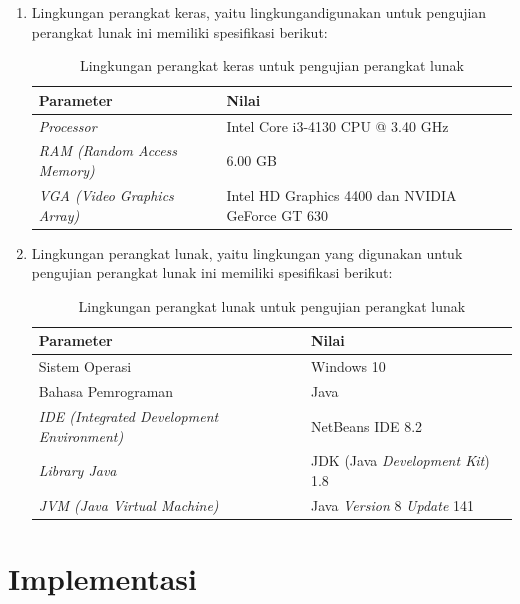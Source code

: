 \begin{enumerate}
\item Lingkungan perangkat keras, yaitu lingkungandigunakan untuk pengujian perangkat lunak ini memiliki spesifikasi berikut:

\begin{table}
\centering
\captionsetup{justification=centering}
\caption[Lingkungan perangkat keras untuk pengujian perangkat lunak]{Lingkungan perangkat keras untuk pengujian perangkat lunak}
\begin{tabular}{| l | l |}
\hline
Parameter & Nilai \\
\hline \hline
\textit{Processor} & Intel Core i3-4130 CPU @ 3.40 GHz \\
\hline
\textit{RAM (Random Access Memory)} & 6.00 GB \\
\hline
\textit{VGA (Video Graphics Array)} & Intel HD Graphics 4400 dan NVIDIA GeForce GT 630 \\
\hline
\end{tabular}
\label{tab:lingkunganpk}
\end{table}

\item Lingkungan perangkat lunak, yaitu lingkungan yang digunakan untuk pengujian perangkat lunak ini memiliki spesifikasi berikut:

\begin{table}
\centering
\captionsetup{justification=centering}
\caption[Lingkungan perangkat lunak untuk pengujian perangkat lunak]{Lingkungan perangkat lunak untuk pengujian perangkat lunak}
\begin{tabular}{| l | l |}
\hline
Parameter & Nilai \\
\hline \hline
Sistem Operasi & Windows 10 \\
\hline
Bahasa Pemrograman & Java \\
\hline
\textit{IDE (Integrated Development Environment)} & NetBeans IDE 8.2 \\
\hline
\textit{Library Java} & JDK (Java \textit{Development Kit}) 1.8 \\
\hline
\textit{JVM (Java Virtual Machine)} & Java \textit{Version} 8 \textit{Update} 141 \\
\hline
\end{tabular}
\label{tab:lingkunganpl}
\end{table}

\end{enumerate}

\section{Implementasi}
\label{sec:implementasi}

